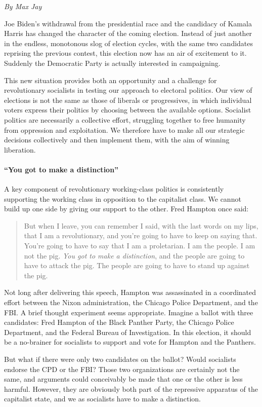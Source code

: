 \emph{By Max Jay}

Joe Biden's withdrawal from the presidential race and the candidacy of Kamala Harris has changed the character of the coming election. Instead of just another in the endless, monotonous slog of election cycles, with the same two candidates reprising the previous contest, this election now has an air of excitement to it. Suddenly the Democratic Party is actually interested in campaigning.

This new situation provides both an opportunity and a challenge for revolutionary socialists in testing our approach to electoral politics. Our view of elections is not the same as those of liberals or progressives, in which individual voters express their politics by choosing between the available options. Socialist politics are necessarily a collective effort, struggling together to free humanity from oppression and exploitation. We therefore have to make all our strategic decisions collectively and then implement them, with the aim of winning liberation.

\paragraph{``You got to make a distinction''}

A key component of revolutionary working-class politics is consistently supporting the working class in opposition to the capitalist class. We cannot build up one side by giving our support to the other. Fred Hampton once said:

\blockquote{But when I leave, you can remember I said, with the last words on my lips, that I am a revolutionary, and you're going to have to keep on saying that. You're going to have to say that I am a proletarian. I am the people. I am not the pig. \emph{You got to make a distinction}, and the people are going to have to attack the pig. The people are going to have to stand up against the pig.}

Not long after delivering this speech, Hampton was assassinated in a coordinated effort between the Nixon administration, the Chicago Police Department, and the FBI. A brief thought experiment seems appropriate. Imagine a ballot with three candidates: Fred Hampton of the Black Panther Party, the Chicago Police Department, and the Federal Bureau of Investigation. In this election, it should be a no-brainer for socialists to support and vote for Hampton and the Panthers.

But what if there were only two candidates on the ballot? Would socialists endorse the CPD or the FBI? Those two organizations are certainly not the same, and arguments could conceivably be made that one or the other is less harmful. However, they are obviously both part of the repressive apparatus of the capitalist state, and we as socialists have to make a distinction.

